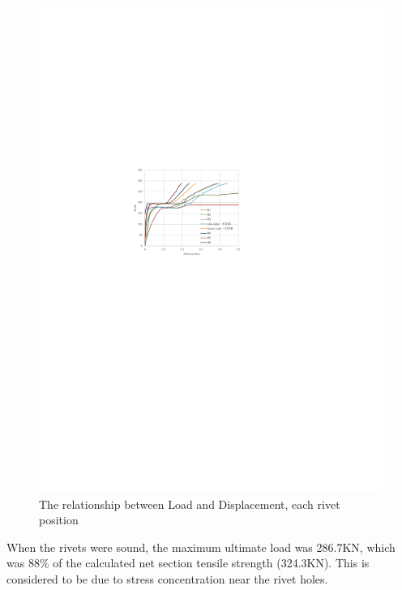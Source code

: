 \begin{figure}[htbp]
\begin{minipage}[t]{0.48\textwidth}
    \includegraphics[width=\linewidth]{imgs/ch3/fig3-17.pdf}
    \caption{The relationship between Load and Displacement, each rivet position}
    \label{fig3-17}
    \end{minipage}
\end{figure}


When the rivets were sound, the maximum ultimate load was 286.7KN, which was 88\% of the calculated net section tensile strength (324.3KN). This is considered to be due to stress concentration near the rivet holes.

